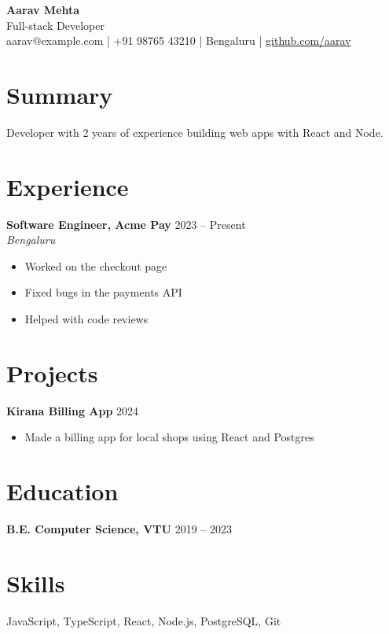 \documentclass[11pt]{article}
\begin{document}
\begin{center}
  {\LARGE\bfseries Aarav Mehta} \\[2pt]
  Full-stack Developer \\[2pt]
  \small aarav@example.com \;|\; +91 98765 43210 \;|\; Bengaluru \;|\; \href{https://github.com/aarav}{github.com/aarav}
\end{center}

\section*{Summary}
Developer with 2 years of experience building web apps with React and Node.

\section*{Experience}
\textbf{Software Engineer, Acme Pay} \hfill 2023 -- Present \\
\textit{Bengaluru}
\begin{itemize}
  \item Worked on the checkout page
  \item Fixed bugs in the payments API
  \item Helped with code reviews
\end{itemize}

\section*{Projects}
\textbf{Kirana Billing App} \hfill 2024
\begin{itemize}
  \item Made a billing app for local shops using React and Postgres
\end{itemize}

\section*{Education}
\textbf{B.E. Computer Science, VTU} \hfill 2019 -- 2023

\section*{Skills}
JavaScript, TypeScript, React, Node.js, PostgreSQL, Git
\end{document}
